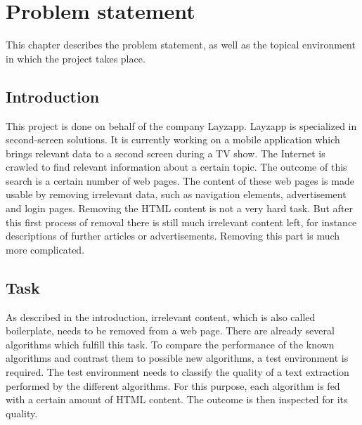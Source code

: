 
\chapter{Problem statement} %

\label{Problem statement} %



This chapter describes the problem statement, as well as the topical environment in which the project takes place.


\section{Introduction}

This project is done on behalf of the company Layzapp. Layzapp is specialized in second-screen solutions. It is currently working on a mobile application which brings relevant data to a second screen during a TV show. The Internet is crawled to find relevant information about a certain topic. The outcome of this search is a certain number of web pages. The content of these web pages is made usable by removing irrelevant data, such as navigation elements, advertisement and login pages. Removing the HTML content is not a very hard task. But after this first process of removal there is still much irrelevant content left, for instance descriptions of further articles or advertisements. Removing this part is much more complicated. 

\section{Task}

As described in the introduction, irrelevant content, which is also called boilerplate, needs to be removed from a web page. There are already several algorithms which fulfill this task. To compare the performance of the known algorithms and contrast them to possible new algorithms, a test environment is required. The test environment needs to classify the quality of a text extraction performed by the different algorithms. For this purpose, each algorithm is fed with a certain amount of HTML content. The outcome is then inspected for its quality. 

